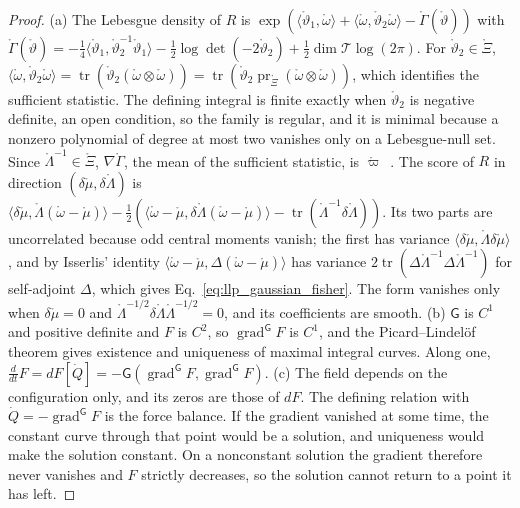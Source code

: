 \begin{proof}
(a) The Lebesgue density of $R$ is $\exp(\langle\mathring\vartheta_1,\mathring\omega\rangle+\langle\mathring\omega,\mathring\vartheta_2\mathring\omega\rangle-\mathring\Gamma(\mathring\vartheta))$ with $\mathring\Gamma(\mathring\vartheta)=-\frac14\langle\mathring\vartheta_1,\mathring\vartheta_2^{-1}\mathring\vartheta_1\rangle-\frac12\log\det(-2\mathring\vartheta_2)+\frac12\dim\mathcal T\log(2\pi)$. For $\mathring\vartheta_2\in\mathring\Xi$, $\langle\mathring\omega,\mathring\vartheta_2\mathring\omega\rangle=\operatorname{tr}(\mathring\vartheta_2(\mathring\omega\otimes\mathring\omega))=\operatorname{tr}(\mathring\vartheta_2\operatorname{pr}_{\mathring\Xi}(\mathring\omega\otimes\mathring\omega))$, which identifies the sufficient statistic. The defining integral is finite exactly when $\mathring\vartheta_2$ is negative definite, an open condition, so the family is regular, and it is minimal because a nonzero polynomial of degree at most two vanishes only on a Lebesgue-null set. Since $\mathring\Lambda^{-1}\in\mathring\Xi$, $\nabla\mathring\Gamma$, the mean of the sufficient statistic, is $\mathring\varpi$~\cite{Brown1986}. The score of $R$ in direction $(\delta\mathring\mu,\delta\mathring\Lambda)$ is $\langle\delta\mathring\mu,\mathring\Lambda(\mathring\omega-\mathring\mu)\rangle-\frac12(\langle\mathring\omega-\mathring\mu,\delta\mathring\Lambda(\mathring\omega-\mathring\mu)\rangle-\operatorname{tr}(\mathring\Lambda^{-1}\delta\mathring\Lambda))$. Its two parts are uncorrelated because odd central moments vanish; the first has variance $\langle\delta\mathring\mu,\mathring\Lambda\delta\mathring\mu\rangle$, and by Isserlis' identity $\langle\mathring\omega-\mathring\mu,\Delta(\mathring\omega-\mathring\mu)\rangle$ has variance $2\operatorname{tr}(\Delta\mathring\Lambda^{-1}\Delta\mathring\Lambda^{-1})$ for self-adjoint $\Delta$, which gives Eq.~\eqref{eq:llp_gaussian_fisher}. The form vanishes only when $\delta\mathring\mu=0$ and $\mathring\Lambda^{-1/2}\delta\mathring\Lambda\mathring\Lambda^{-1/2}=0$, and its coefficients are smooth.
(b) $\mathsf G$ is $C^1$ and positive definite and $F$ is $C^2$, so $\operatorname{grad}^{\mathsf G}F$ is $C^1$, and the Picard--Lindel\"of theorem gives existence and uniqueness of maximal integral curves. Along one, $\frac{d}{dt}F=dF[\dot Q]=-\mathsf G(\operatorname{grad}^{\mathsf G}F,\operatorname{grad}^{\mathsf G}F)$.
(c) The field depends on the configuration only, and its zeros are those of $dF$. The defining relation with $\dot Q=-\operatorname{grad}^{\mathsf G}F$ is the force balance. If the gradient vanished at some time, the constant curve through that point would be a solution, and uniqueness would make the solution constant. On a nonconstant solution the gradient therefore never vanishes and $F$ strictly decreases, so the solution cannot return to a point it has left.

\end{proof}
